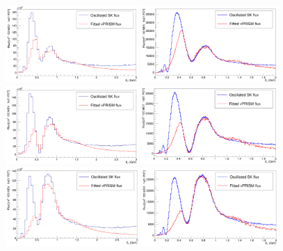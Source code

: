 \begin{figure}
\begin{minipage}[t]{1.0\textwidth}
\begin{center}
\includegraphics[width=0.45\textwidth] {figures/FittedFlux_dm2_2_56_theta23_0_61.png}
\includegraphics[width=0.46\textwidth] {figures/NewFit_Sin0p61_dM_2p56.png}
\includegraphics[width=0.45\textwidth] {figures/FittedFlux_dm2_2_41_theta23_0_48.png}
\includegraphics[width=0.46\textwidth] {figures/NewFit_Sin0p48_dM2p41.png}
\includegraphics[width=0.45\textwidth] {figures/FittedFlux_dm2_2_26_theta23_0_41.png}
\includegraphics[width=0.46\textwidth] {figures/NewFit_Sin0p41_dM2p26.png}

\end{center}
\end{minipage}
\end{figure}
